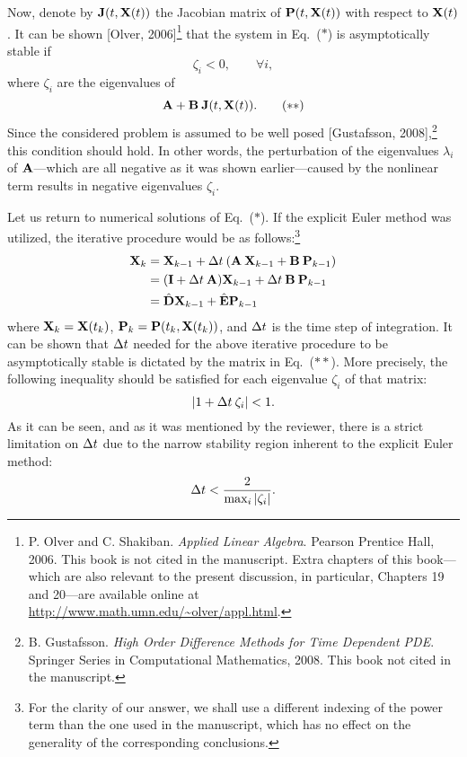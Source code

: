 \begin{authors}
Now, denote by $\m{J}(\t, \vX(\t))$ the Jacobian matrix of $\mathbf{P}(t, \mathbf{X}(t))$ with respect to $\mathbf{X}(t)$.
It can be shown [Olver, 2006]\footnote{P. Olver and C. Shakiban. \emph{Applied Linear Algebra}. Pearson Prentice Hall, 2006. This book is not cited in the manuscript. Extra chapters of this book---which are also relevant to the present discussion, in particular, Chapters 19 and 20---are available online at \url{http://www.math.umn.edu/~olver/appl.html}.} that the system in Eq.~($\ast$) is asymptotically stable if
\[
  \zeta_i < 0, \qquad \forall i,
\]
where $\zeta_i$ are the eigenvalues of
\begin{equation}
  \mA + \mB \: \m{J}(\t, \vX(\t)). \tag{$\ast\ast$}
\end{equation}
Since the considered problem is assumed to be well posed [Gustafsson, 2008],\footnote{B. Gustafsson. \emph{High Order Difference Methods for Time Dependent PDE}. Springer Series in Computational Mathematics, 2008. This book not cited in the manuscript.} this condition should hold.
In other words, the perturbation of the eigenvalues $\lambda_i$ of $\mA$---which are all negative as it was shown earlier---caused by the nonlinear term results in negative eigenvalues $\zeta_i$.

Let us return to numerical solutions of Eq.~($\ast$).
If the explicit Euler method was utilized, the iterative procedure would be as follows:\footnote{For the clarity of our answer, we shall use a different indexing of the power term than the one used in the manuscript, which has no effect on the generality of the corresponding conclusions.}
\begin{align*}
  \vX_k & = \vX_{k - 1} + \Delta \t \: (\mA \: \vX_{k - 1} + \mB \: \vP_{k - 1}) \\
  & = (\mI + \Delta \t \: \mA) \vX_{k - 1} + \Delta \t \: \mB \: \vP_{k - 1} \\
  & = \hat{\mCF} \vX_{k - 1} + \hat{\mCS} \vP_{k - 1}
\end{align*}
where $\mathbf{X}_k = \mathbf{X}(t_k)$, $\mathbf{P}_k = \mathbf{P}(t_k, \mathbf{X}(t_k))$, and $\Delta t$ is the time step of integration.
It can be shown that $\Delta t$ needed for the above iterative procedure to be asymptotically stable is dictated by the matrix in Eq.~($\ast\ast$).
More precisely, the following inequality should be satisfied for each eigenvalue $\zeta_i$ of that matrix:
\[
  |1 + \Delta t \: \zeta_i | < 1.
\]
As it can be seen, and as it was mentioned by the reviewer, there is a strict limitation on $\Delta t$ due to the narrow stability region inherent to the explicit Euler method:
\[
  \Delta t < \frac{2}{\max_i |\zeta_i|}.
\]


\end{authors}
